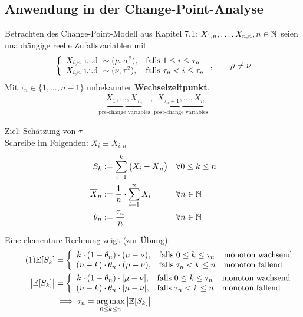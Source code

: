 \subsection{Anwendung in der Change-Point-Analyse} %
Betrachten des Change-Point-Modell aus Kapitel 7.1:
$X_{1,n},\ldots,X_{n,n},n\in\mathbb{N}$ seien unabhängige reelle Zufallsvariablen mit 
\begin{align*}
	\left\lbrace\begin{array}{ll}
		X_{i,n}\text{ i.i.d }\sim(\mu,\sigma^2), &\text{falls } 1\leq i\leq\tau_n\\
		X_{i,n}\text{ i.i.d }\sim(\nu,\tau^2), &\text{falls } \tau_n< i\leq\tau_n\\
	\end{array}\right.,\qquad\mu\neq\nu
\end{align*}
Mit $\tau_n\in\big\lbrace1,\ldots,n-1\big\rbrace$ unbekannter \textbf{Wechselzeitpunkt}.
\begin{align*}
	\underbrace{X_1,\ldots,X_{\tau_n}}_{\text{pre-change variables}},\underbrace{X_{\tau_n+1},\ldots,X_n}_{\text{post-change variables}}
\end{align*}

\underline{Ziel:} Schätzung von $\tau$\\
Schreibe im Folgenden: $X_i\equiv X_{i,n}$
\begin{align*}
	S_k&:=\sum\limits_{i=1}^k\big(X_i-\overline{X}_n\big) &\forall& 0\leq k\leq n\\
	\overline{X}_n&:=\frac{1}{n}\cdot\sum\limits_{i=1}^n X_i &\forall& n\in\mathbb{N}\\
	\theta_n&:=\frac{\tau_n}{n} &\forall& n\in\mathbb{N}
\end{align*}

Eine elementare Rechnung zeigt (zur Übung):
\begin{align}\label{eqUnder8.2_1}\tag{1}
	\mathbb{E}[S_k]
	&=\left\lbrace\begin{array}{cll}
		k\cdot(1-\theta_n)\cdot(\mu-\nu), &\text{falls } 0\leq k\leq\tau_n &\text{monoton wachsend}\\
		(n-k)\cdot\theta_n\cdot(\mu-\nu), &\text{falls }\tau_n<k\leq n &\text{monoton fallend}
	\end{array}\right.\\\nonumber
	\big|\mathbb{E}[S_k]\big|
	&=\left\lbrace\begin{array}{cll}
		k\cdot(1-\theta_n)\cdot|\mu-\nu|, &\text{falls } 0\leq k\leq\tau_n &\text{monoton wachsend}\\
		(n-k)\cdot\theta_n\cdot|\mu-\nu|, &\text{falls }\tau_n<k\leq n &\text{monoton fallend}
	\end{array}\right.\\
	&\implies\tau_n=\operatorname*{arg\,max}\limits_{0\leq k\leq n}\big|\mathbb{E}[S_k]\big|\nonumber
\end{align}

